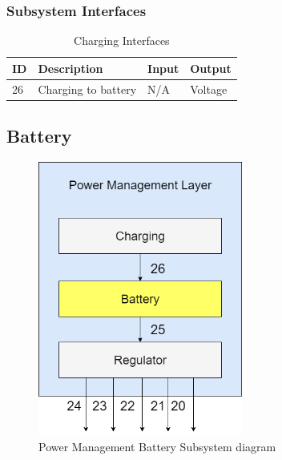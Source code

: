 \subsubsection{Subsystem Interfaces}

\begin{table}[H]
\caption{Charging Interfaces}
\begin{center}
\begin{tabular}{|l|l|l|l|}
    \hline
    ID & Description & Input & Output \\ \hline
    26 & Charging to battery & N/A & Voltage \\ \hline
\end{tabular}
\end{center}
\end{table}

\subsection{Battery}

\begin{figure}[h!]
	\centering
 	\includegraphics[width=0.60\textwidth]{images/PowerMgmtLayer_battery.drawio.png}
 \caption{Power Management Battery Subsystem diagram}
\end{figure}

